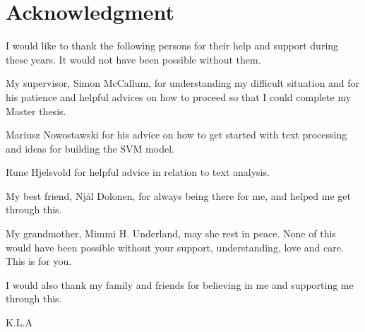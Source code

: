 \chapter*{Acknowledgment}
I would like to thank the following persons for their help and support during these years. It would not have been possible without them.

My supervisor, Simon McCallum, for understanding my difficult situation and for his patience and helpful advices on how to proceed so that I could complete my Master thesis.

Mariusz Nowostawski for his advice on how to get started with text processing and ideas for building the SVM model. 

Rune Hjelsvold for helpful advice in relation to text analysis.

My best friend, Njål Dolonen, for always being there for me, and helped me get through this.

My grandmother, Mimmi H. Underland, may she rest in peace. None of this would have been possible without your support, understanding, love and care. This is for you.

I would also thank my family and friends for believing in me and supporting me through this.

\begin{flushright}
K.L.A
\end{flushright}